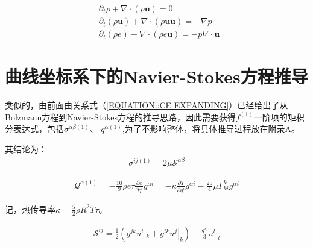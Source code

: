 \documentclass[LBMDerivation.tex]{subfiles}
\begin{document}
\begin{equation}
  \begin{aligned}
     & \partial_t \rho + \nabla \cdot (\rho \boldsymbol{u})=0                                                      \\
     & \partial_{t}\left(\rho \boldsymbol{u} \right)+ \nabla \cdot (\rho \boldsymbol{u} \boldsymbol{u}) =-\nabla p \\
     & \partial_{t}\left(\rho e \right) + \nabla \cdot (\rho e \boldsymbol{u})=-p \nabla \cdot \boldsymbol{u}
  \end{aligned}
  \label{EQUATION::Eluer2} ~
\end{equation}
%


%
%
%
%
%
\section{曲线坐标系下的Navier-Stokes方程推导}
%
%

类似的，由前面由关系式（\ref{EQUATION::CE EXPANDING}）已经给出了从Bolzmann方程到Navier-Stokes方程的推导思路，因此需要获得$f^{(1)}$一阶项的矩积分表达式，包括$\sigma^{\alpha\beta(1)}$、 $q^{\alpha (1)}$,为了不影响整体，将具体推导过程放在附录A。


其结论为：
\begin{equation}
  \begin{gathered}
    \sigma^{ij(1)}= 2 \mu \mathcal{S}^{\alpha\beta}
  \end{gathered}
\end{equation}




\begin{equation}
  \begin{gathered}
    \mathcal{Q}^{\alpha (1)}
    = -\frac{10}{9}\rho e \tau \frac{\partial e}{\partial q^i} g^{\alpha i}=  -\kappa \frac{\partial T}{\partial q^i} g^{\alpha i} - \frac{25}{4}\mu \Gamma_{ki}^{k}g^{\alpha i}
  \end{gathered}
\end{equation}

记，热传导率$\kappa=\frac{5}{2}\rho R^2 T \tau$。




\begin{equation}
  \begin{gathered}
    \mathcal{S}^{ij}=\frac{1}{2} (g^{jk} u^i|_k+g^{ik} u^j|_k) -\frac{g^{ij}}{3}u^l|_l
  \end{gathered}
\end{equation}
\end{document}
